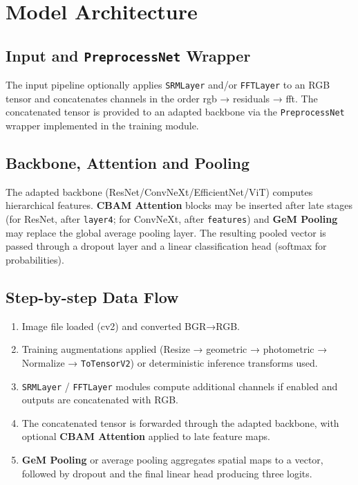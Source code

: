 \documentclass[11pt]{report}
\begin{document}
\section{Model Architecture}
\subsection{Input and \texttt{PreprocessNet} Wrapper}
The input pipeline optionally applies \texttt{SRMLayer} and/or \texttt{FFTLayer}
to an RGB tensor and concatenates channels in the order rgb → residuals → fft.
The concatenated tensor is provided to an adapted backbone via the
\texttt{PreprocessNet} wrapper implemented in the training module.

\subsection{Backbone, Attention and Pooling}
The adapted backbone (ResNet/ConvNeXt/EfficientNet/ViT) computes hierarchical
features. \textbf{CBAM Attention} blocks may be inserted after late stages
(for ResNet, after \texttt{layer4}; for ConvNeXt, after \texttt{features}) and
\textbf{GeM Pooling} may replace the global average pooling layer. The
resulting pooled vector is passed through a dropout layer and a linear
classification head (softmax for probabilities).

\subsection{Step-by-step Data Flow}
\begin{enumerate}[label=\textbf{Step \arabic*:}]
  \item Image file loaded (cv2) and converted BGR→RGB.
  \item Training augmentations applied (Resize → geometric → photometric →
  Normalize → \texttt{ToTensorV2}) or deterministic inference transforms used.
  \item \texttt{SRMLayer} / \texttt{FFTLayer} modules compute additional
  channels if enabled and outputs are concatenated with RGB.
  \item The concatenated tensor is forwarded through the adapted backbone, with
  optional \textbf{CBAM Attention} applied to late feature maps.
  \item \textbf{GeM Pooling} or average pooling aggregates spatial maps to a
  vector, followed by dropout and the final linear head producing three logits.
\end{enumerate}
\end{document}
